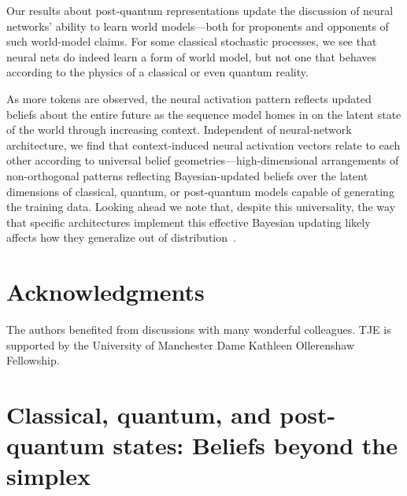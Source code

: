 \documentclass[prx,nofootinbib,onecolumn,showkeys,groupaddress,preprintnumbers,floatfix,
superscriptaddress]{revtex4-1}
\begin{document}
Our %
results about post-quantum representations 
update the discussion of neural networks' ability to learn world models---both for proponents and opponents of such world-model claims.  %
For some classical stochastic processes, 
we see that neural nets do indeed learn a form of world model, but not one that behaves according to the physics of a classical or even quantum reality.

As more tokens are observed, 
the neural activation pattern reflects updated beliefs about the entire future 
as the sequence model homes in 
on the latent state of 
the world %
through increasing context.
Independent of neural-network architecture, we find that context-induced neural activation vectors 
relate to each other according to 
universal 
belief geometries---high-dimensional arrangements of non-orthogonal patterns reflecting Bayesian-updated beliefs over the latent dimensions of classical, quantum, or post-quantum models capable of generating the training data.
Looking ahead we note that, despite this universality, the way that specific architectures implement this effective Bayesian updating likely affects how they generalize out of distribution~\cite{Piotrowski25_Constrained, Riechers25_Next}.

\section*{Acknowledgments}

The authors benefited from discussions with many wonderful colleagues.
TJE is supported by the University of Manchester Dame Kathleen Ollerenshaw Fellowship.


\appendix


\section{Classical, quantum, and post-quantum states:  Beliefs beyond the simplex}
\end{document}

